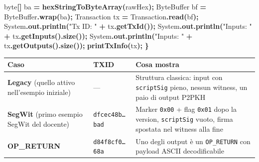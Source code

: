 \documentclass[
  italian,
  openany]{book}
\newenvironment{Shaded}{\begin{snugshade}}{\end{snugshade}}
\newcommand{\BuiltInTok}[1]{#1}
\newcommand{\DataTypeTok}[1]{\textcolor[rgb]{0.13,0.29,0.53}{#1}}
\newcommand{\FunctionTok}[1]{\textcolor[rgb]{0.13,0.29,0.53}{\textbf{#1}}}
\newcommand{\NormalTok}[1]{#1}
\newcommand{\OperatorTok}[1]{\textcolor[rgb]{0.81,0.36,0.00}{\textbf{#1}}}
\newcommand{\StringTok}[1]{\textcolor[rgb]{0.31,0.60,0.02}{#1}}
\newcounter{none} %
\begin{document}
\begin{Shaded}
\begin{Highlighting}[]
    \DataTypeTok{byte}\OperatorTok{[]}\NormalTok{ ba }\OperatorTok{=} \FunctionTok{hexStringToByteArray}\OperatorTok{(}\NormalTok{rawHex}\OperatorTok{);}
    \BuiltInTok{ByteBuffer}\NormalTok{ bf }\OperatorTok{=} \BuiltInTok{ByteBuffer}\OperatorTok{.}\FunctionTok{wrap}\OperatorTok{(}\NormalTok{ba}\OperatorTok{);}
\NormalTok{    Transaction tx }\OperatorTok{=}\NormalTok{ Transaction}\OperatorTok{.}\FunctionTok{read}\OperatorTok{(}\NormalTok{bf}\OperatorTok{);}
    \BuiltInTok{System}\OperatorTok{.}\FunctionTok{out}\OperatorTok{.}\FunctionTok{println}\OperatorTok{(}\StringTok{"Tx ID: "} \OperatorTok{+}\NormalTok{ tx}\OperatorTok{.}\FunctionTok{getTxId}\OperatorTok{());}
    \BuiltInTok{System}\OperatorTok{.}\FunctionTok{out}\OperatorTok{.}\FunctionTok{println}\OperatorTok{(}\StringTok{"Inputs: "} \OperatorTok{+}\NormalTok{ tx}\OperatorTok{.}\FunctionTok{getInputs}\OperatorTok{().}\FunctionTok{size}\OperatorTok{());}
    \BuiltInTok{System}\OperatorTok{.}\FunctionTok{out}\OperatorTok{.}\FunctionTok{println}\OperatorTok{(}\StringTok{"Inputs: "} \OperatorTok{+}\NormalTok{ tx}\OperatorTok{.}\FunctionTok{getOutputs}\OperatorTok{().}\FunctionTok{size}\OperatorTok{());}
    \FunctionTok{printTxInfo}\OperatorTok{(}\NormalTok{tx}\OperatorTok{);}
\OperatorTok{\}}
\end{Highlighting}
\end{Shaded}

{\def\LTcaptype{none} %
\begin{longtable}[]{@{}
  >{\raggedright\arraybackslash}p{}
  >{\raggedright\arraybackslash}p{}
  >{\raggedright\arraybackslash}p{}@{}}
\toprule\noalign{}
\begin{minipage}[b]{\linewidth}\raggedright
Caso
\end{minipage} & \begin{minipage}[b]{\linewidth}\raggedright
TXID
\end{minipage} & \begin{minipage}[b]{\linewidth}\raggedright
Cosa mostra
\end{minipage} \\
\midrule\noalign{}
\endhead
\bottomrule\noalign{}
\endlastfoot
\textbf{Legacy} (quello attivo nell'esempio iniziale) & --- & Struttura
classica: input con \texttt{scriptSig} pieno, nessun witness, un paio di
output P2PKH \\
\textbf{SegWit} (primo esempio SegWit del docente) &
\texttt{dfcec48b…bad} & Marker \texttt{0x00} + flag \texttt{0x01} dopo
la version, \texttt{scriptSig} vuoto, firma spostata nel witness alla
fine \\
\textbf{OP\_RETURN} & \texttt{d84f8cf0…68a} & Uno degli output è un
\texttt{OP\_RETURN} con payload ASCII decodificabile \\
\end{longtable}
}
\end{document}
